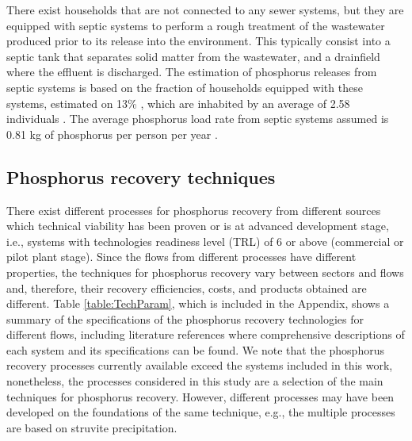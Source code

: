 \documentclass[authoryear]{elsarticle}
\begin{document}
There exist households that are not connected to any sewer systems, but they are equipped with septic systems to perform a rough treatment of the wastewater produced prior to its release into the environment. This typically consist into a septic tank that separates solid matter from the wastewater, and a drainfield where the effluent is discharged. The estimation of phosphorus releases from septic systems is based on the fraction of households equipped with these systems, estimated on 13\% \citep{CanadaSepticSystems}, which are inhabited by an average of 2.58 individuals \citep{CanadaPersonPerHouse}. The average phosphorus load rate from septic systems assumed is 0.81 kg of phosphorus per person per year
\citep{oldfield2020estimation}.

\subsection{Phosphorus recovery techniques} \label{section:PRecoveryTechs}
There exist different processes for phosphorus recovery from different sources which technical viability has been proven or is at advanced development stage, i.e., systems with technologies readiness level (TRL) \citep{TRLDefinitions} of 6 or above (commercial or pilot plant stage). Since the flows from different processes have different properties, the techniques for phosphorus recovery vary between sectors and flows and, therefore, their recovery efficiencies, costs, and products obtained are different. Table \ref{table:TechParam}, which is included in the Appendix, shows a summary of the specifications of the phosphorus recovery technologies for different flows, including literature references where comprehensive descriptions of each system and its specifications can be found. We note that the phosphorus recovery processes currently available exceed the systems included in this work, nonetheless, the processes considered in this study are a selection of the main techniques for phosphorus recovery.
However, different processes may have been developed on the foundations of the same technique,
e.g., the multiple processes are based on struvite precipitation. 
\end{document}
